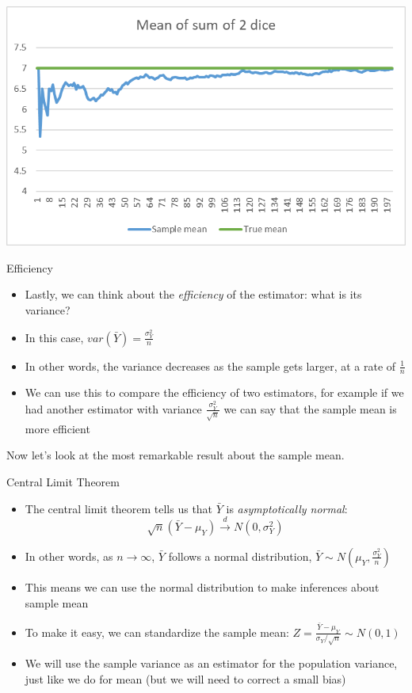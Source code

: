 \documentclass[aspectratio=169]{beamer}
\begin{document}
\begin{frame}
    \centering
    \includegraphics[width = .8\textwidth,keepaspectratio]{LLN.png}
\end{frame}

\begin{frame}{Efficiency}
    \begin{itemize}
        \item Lastly, we can think about the \textit{efficiency} of the estimator: what is its variance?
        \item In this case, $var(\bar{Y}) = \frac{\sigma_Y^2}{n}$
        \item In other words, the variance decreases as the sample gets larger, at a rate of $\frac{1}{n}$
        \item We can use this to compare the efficiency of two estimators, for example if we had another estimator with variance $\frac{\sigma_Y^2}{\sqrt{n}}$ we can say that the sample mean is more efficient
    \end{itemize}
    Now let's look at the most remarkable result about the sample mean.
\end{frame}

\begin{frame}{Central Limit Theorem}
    \begin{itemize}
        \item The central limit theorem tells us that $\bar{Y}$ is \textit{asymptotically normal}: 
        $$
            \sqrt{n} (\bar{Y} - \mu_Y) \xrightarrow{d} N(0,\sigma_Y^2)
        $$
        \item In other words, as $n \to \infty$, $\bar{Y}$ follows a normal distribution, $\bar{Y} \sim N(\mu_Y,\frac{\sigma_Y^2}{n})$
        \item This means we can use the normal distribution to make inferences about sample mean
        \item To make it easy, we can standardize the sample mean: $Z = \frac{\bar{Y} - \mu_Y}{\sigma_Y/\sqrt{n}} \sim N(0,1)$
        \item We will use the sample variance as an estimator for the population variance, just like we do for mean (but we will need to correct a small bias)
    \end{itemize}
\end{frame}
\end{document}
